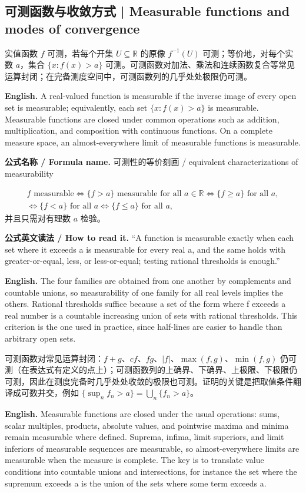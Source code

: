 \documentclass[UTF8,11pt,a4paper]{ctexart}
\newcommand{\EN}[1]{\par\noindent\textbf{English.} #1\par}
\newcommand{\READ}[1]{\par\noindent\textbf{公式英文读法 / How to read it.} #1\par}
\let\APSsubsection\subsection
\renewcommand{\subsection}[1]{\Needspace{6\baselineskip}\APSsubsection{#1}}
\newcommand{\FORMULA}[2]{\par\Needspace{3\baselineskip}\noindent\textbf{公式名称 / Formula name.} #1 / #2\par}
\begin{document}
\subsection{可测函数与收敛方式 | Measurable functions and modes of convergence}
\noindent 实值函数 $f$ 可测，若每个开集 $U\subseteq\mathbb R$ 的原像 $f^{-1}(U)$ 可测；等价地，对每个实数 $a$，集合 $\{x:f(x)>a\}$ 可测。可测函数对加法、乘法和连续函数复合等常见运算封闭；在完备测度空间中，可测函数列的几乎处处极限仍可测。
\EN{A real-valued function is measurable if the inverse image of every open set is measurable; equivalently, each set $\{x:f(x)>a\}$ is measurable. Measurable functions are closed under common operations such as addition, multiplication, and composition with continuous functions. On a complete measure space, an almost-everywhere limit of measurable functions is measurable.}
\FORMULA{可测性的等价刻画}{equivalent characterizations of measurability}
\[
\begin{gathered}
f\text{ measurable}
\iff \{f>a\}\text{ measurable for all }a\in\mathbb R
\iff \{f\ge a\}\text{ for all }a,\\
\iff \{f<a\}\text{ for all }a
\iff \{f\le a\}\text{ for all }a,
\end{gathered}
\]
并且只需对有理数 $a$ 检验。
\READ{“A function is measurable exactly when each set where it exceeds a is measurable for every real a, and the same holds with greater-or-equal, less, or less-or-equal; testing rational thresholds is enough.”}
\EN{The four families are obtained from one another by complements and countable unions, so measurability of one family for all real levels implies the others. Rational thresholds suffice because a set of the form where f exceeds a real number is a countable increasing union of sets with rational thresholds. This criterion is the one used in practice, since half-lines are easier to handle than arbitrary open sets.}
\noindent 可测函数对常见运算封闭：$f+g$、$cf$、$fg$、$|f|$、$\max(f,g)$、$\min(f,g)$ 仍可测（在表达式有定义的点上）；可测函数列的上确界、下确界、上极限、下极限仍可测，因此在测度完备时几乎处处收敛的极限也可测。证明的关键是把取值条件翻译成可数并交，例如 $\{\sup_n f_n>a\}=\bigcup_n\{f_n>a\}$。
\EN{Measurable functions are closed under the usual operations: sums, scalar multiples, products, absolute values, and pointwise maxima and minima remain measurable where defined. Suprema, infima, limit superiors, and limit inferiors of measurable sequences are measurable, so almost-everywhere limits are measurable when the measure is complete. The key is to translate value conditions into countable unions and intersections, for instance the set where the supremum exceeds a is the union of the sets where some term exceeds a.}
\end{document}
